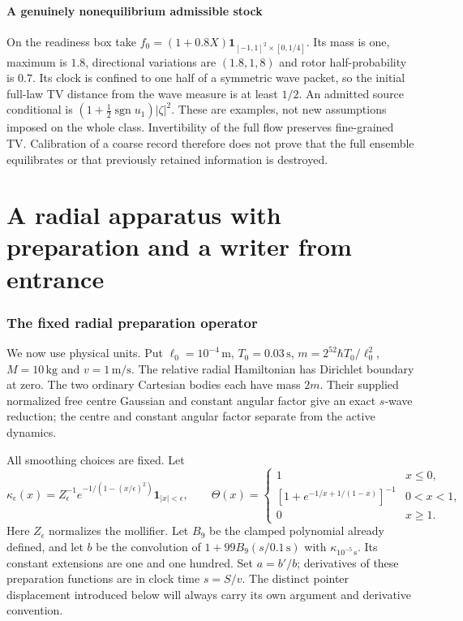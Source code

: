 \documentclass[11pt]{article}
\theoremstyle{definition}\newtheorem{definition}[theorem]{Definition}
\theoremstyle{remark}\newtheorem{remark}[theorem]{Remark}
\newcommand{\one}{\mathbf1}\newcommand{\R}{\mathbb R}\newcommand{\T}{\mathbb T}
\begin{document}
\subsection{A genuinely nonequilibrium admissible stock}
On the readiness box take
$f_0=(1+0.8X)\one_{[-1,1]^2\times[0,1/4]}$.
Its mass is one, maximum is $1.8$, directional variations are
$(1.8,1,8)$ and rotor half-probability is $0.7$. Its clock is confined
to one half of a symmetric wave packet, so the initial full-law TV
distance from the wave measure is at least $1/2$. An admitted source
conditional is $(1+\tfrac12\operatorname{sgn}u_1)|\zeta|^2$.
These are examples, not new assumptions imposed on the whole class.
Invertibility of the full flow preserves fine-grained TV. Calibration
of a coarse record therefore does not prove that the full ensemble
equilibrates or that previously retained information is destroyed.

\part{A radial apparatus with preparation and a writer from entrance}
\section{The fixed radial preparation operator}\label{sec:radial_definition}
We now use physical units. Put $\ell_0=10^{-4}\,\mathrm m$,
$T_0=0.03\,\mathrm s$, $m=2^{52}\hbar T_0/\ell_0^2$,
$M=10\,\mathrm{kg}$ and $v=1\,\mathrm{m/s}$. The relative radial
Hamiltonian has Dirichlet boundary at zero. The two ordinary Cartesian
bodies each have mass $2m$. Their supplied normalized free centre Gaussian
and constant angular factor give an exact $s$-wave reduction;
the centre and constant angular factor separate from the active dynamics.

All smoothing choices are fixed. Let
\[
 \kappa_\epsilon(x)=Z_\epsilon^{-1}
 e^{-1/(1-(x/\epsilon)^2)}\one_{|x|<\epsilon},\qquad
 \Theta(x)=\begin{cases}1&x\le0,\\
 [1+e^{-1/x+1/(1-x)}]^{-1}&0<x<1,\\0&x\ge1.
 \end{cases}
\]
Here $Z_\epsilon$ normalizes the mollifier. Let $B_9$ be the clamped
polynomial already defined, and let $b$ be the convolution of
$1+99B_9(s/0.1\,\mathrm s)$ with $\kappa_{10^{-5}\,\mathrm s}$.
Its constant extensions are one and one hundred. Set $a=b'/b$;
derivatives of these preparation functions are in clock time $s=S/v$.
The distinct pointer displacement introduced below will always carry
its own argument and derivative convention.
\end{document}

